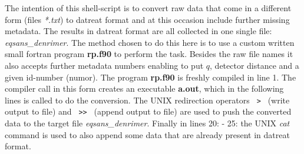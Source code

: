 \documentclass[11pt,fleqn]{book} %
\newcommand{\linespace}{\vspace{4ex}}
\begin{document}
The intention of this shell-script is to convert raw data that come in a different form 
(files \emph{*.txt}) to datreat format and at this occasion include further missing metadata.
The results in datreat format are all collected in one single file: \emph{eqsans\_denrimer}.
The method chosen to do this here is to use a custom written small fortran program {\bf rp.f90}
to perform the task. Besides the raw file names it also accepts further metadata numbers
enabling to put ${q}$, detector distance and a given id-number (numor).
The program  {\bf rp.f90} is freshly compiled in line 1. The compiler call in this form
creates an executable {\bf a.out}, which in the following lines is called to do the conversion.
The UNIX redirection operators \verb! > ! (write output to file) and \verb! >> ! (append output to
file) are used to push the converted data to the target file \emph{eqsans\_denrimer}.
Finally in lines 20: - 25: the UNIX \emph{cat} command is used to also append some data that are
already present in datreat format.

\linespace
\end{document}
